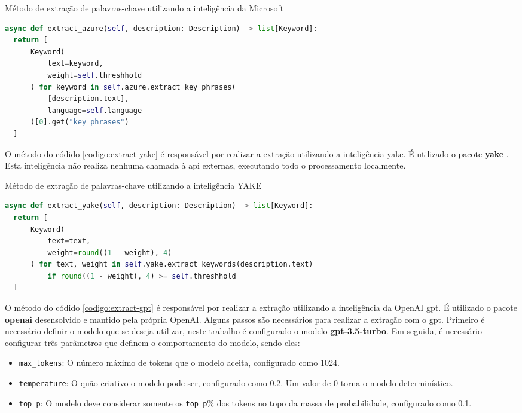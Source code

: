 \begin{sourcecode}[H]
  \caption{\label{codigo:extract-azure}Método de extração de palavras-chave utilizando a inteligência da Microsoft}
  \begin{lstlisting}[frame=single, language=Python]
async def extract_azure(self, description: Description) -> list[Keyword]:
  return [
      Keyword(
          text=keyword, 
          weight=self.threshhold
      ) for keyword in self.azure.extract_key_phrases(
          [description.text], 
          language=self.language
      )[0].get("key_phrases")
  ]
\end{lstlisting}
  \fonte{}
\end{sourcecode}

O método do códido \ref{codigo:extract-yake} é responsável por realizar a extração utilizando a inteligência \gls{yake}. É utilizado o pacote \textbf{yake} \cite{LiaadYake2023}. Esta inteligência não realiza nenhuma chamada à \gls{api} externas, executando todo o processamento localmente.

\begin{sourcecode}[H]
  \caption{\label{codigo:extract-yake}Método de extração de palavras-chave utilizando a inteligência YAKE}
  \begin{lstlisting}[frame=single, language=Python]
async def extract_yake(self, description: Description) -> list[Keyword]:
  return [
      Keyword(
          text=text, 
          weight=round((1 - weight), 4)
      ) for text, weight in self.yake.extract_keywords(description.text)
          if round((1 - weight), 4) >= self.threshhold
  ]
\end{lstlisting}
  \fonte{}
\end{sourcecode}

O método do códido \ref{codigo:extract-gpt} é responsável por realizar a extração utilizando a inteligência da OpenAI \gls{gpt}. É utilizado o pacote \textbf{openai} desensolvido e mantido pela própria OpenAI. Alguns passos são necessários para realizar a extração com o \gls{gpt}. Primeiro é necessário definir o modelo que se deseja utilizar, neste trabalho é configurado o modelo \textbf{gpt-3.5-turbo}. Em seguida, é necessário configurar três parâmetros que definem o comportamento do modelo, sendo eles:

\begin{itemize}
  \item \texttt{max\_tokens}: O número máximo de tokens que o modelo aceita, configurado como 1024.
  \item \texttt{temperature}: O quão criativo o modelo pode ser, configurado como 0.2. Um valor de 0 torna o modelo determinístico.
  \item \texttt{top\_p}: O modelo deve considerar somente os \texttt{top\_p}\% dos tokens no topo da massa de probabilidade, configurado como 0.1.
\end{itemize}

